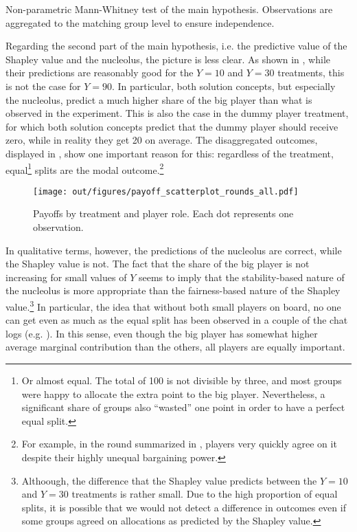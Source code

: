 \begin{table}
    \centering
    
    \caption{Non-parametric Mann-Whitney test of the main hypothesis. Observations are aggregated to the matching group level to ensure independence.}
    \label{tab:main_nonparametric}
\end{table}

Regarding the second part of the main hypothesis, i.e. the predictive value of the Shapley value and the nucleolus, the picture is less clear. As shown in , while their predictions are reasonably good for the $Y=10$ and $Y=30$ treatments, this is not the case for $Y=90$. In particular, both solution concepts, but especially the nucleolus, predict a much higher share of the big player than what is observed in the experiment. This is also the case in the dummy player treatment, for which both solution concepts predict that the dummy player should receive zero, while in reality they get 20 on average. The disaggregated outcomes, displayed in , show one important reason for this: regardless of the treatment, equal\footnote{Or almost equal. The total of 100 is not divisible by three, and most groups were happy to allocate the extra point to the big player. Nevertheless, a significant share of groups also ``wasted'' one point in order to have a perfect equal split.} splits are the modal outcome.\footnote{For example, in the round summarized in , players very quickly agree on it despite their highly unequal bargaining power.}

\begin{figure}
    \centering
    \texttt{[image: out/figures/payoff\_scatterplot\_rounds\_all.pdf]}
    \caption{Payoffs by treatment and player role. Each dot represents one observation.}
    \label{fig:main_scatter}
\end{figure}

In qualitative terms, however, the predictions of the nucleolus are correct, while the Shapley value is not. The fact that the share of the big player is not increasing for small values of $Y$ seems to imply that the stability-based nature of the nucleolus is more appropriate than the fairness-based nature of the Shapley value.\footnote{Althoough, the difference that the Shapley value predicts between the $Y=10$ and $Y=30$ treatments is rather small. Due to the high proportion of equal splits, it is possible that we would not detect a difference in outcomes even if some groups agreed on allocations as predicted by the Shapley value.} In particular, the idea that without both small players on board, no one can get even as much as the equal split has been observed in a couple of the chat logs (e.g. ). In this sense, even though the big player has somewhat higher average marginal contribution than the others, all players are equally important. 

